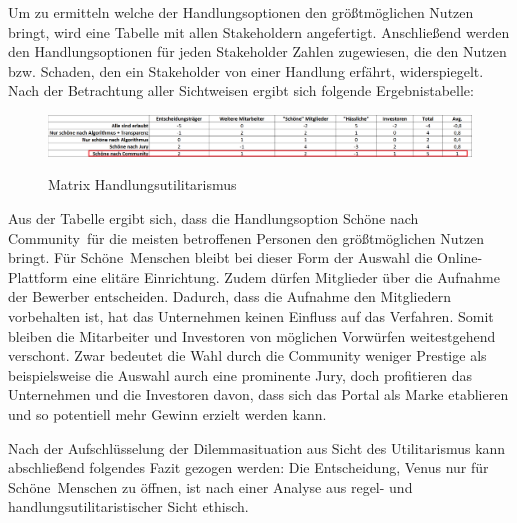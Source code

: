 Um zu ermitteln welche der Handlungsoptionen den größtmöglichen Nutzen bringt, wird eine Tabelle mit allen Stakeholdern angefertigt. Anschließend werden den Handlungsoptionen
für jeden Stakeholder Zahlen zugewiesen, die den Nutzen bzw. Schaden, den ein Stakeholder von einer Handlung erfährt, widerspiegelt. Nach der Betrachtung aller Sichtweisen ergibt sich folgende Ergebnistabelle:
\begin{figure}[hbt]
	\centering
	\begin{minipage}[t]{1\textwidth} %
	\includegraphics[width=1\textwidth]{Handlungsutilitarismus.png}\\ %
	\caption{Matrix Handlungsutilitarismus} %
	\label{abb:util}
	\end{minipage}
\end{figure}

Aus der Tabelle ergibt sich, dass die Handlungsoption \glqq Schöne nach Community\grqq~für die meisten betroffenen Personen den größtmöglichen Nutzen bringt. Für \glqq Schöne\grqq~Menschen bleibt bei dieser Form der Auswahl die Online-Plattform eine elitäre Einrichtung. Zudem dürfen Mitglieder über die Aufnahme der Bewerber entscheiden. Dadurch, dass die Aufnahme den Mitgliedern vorbehalten ist, hat das Unternehmen keinen Einfluss auf das Verfahren. Somit bleiben die Mitarbeiter und Investoren von möglichen Vorwürfen weitestgehend verschont. Zwar bedeutet die Wahl durch die Community weniger Prestige als beispielsweise die Auswahl aurch eine prominente Jury, doch profitieren das Unternehmen und die Investoren davon, dass sich das Portal als Marke etablieren und so potentiell mehr Gewinn erzielt werden kann.

Nach der Aufschlüsselung der Dilemmasituation aus Sicht des Utilitarismus kann abschließend folgendes Fazit gezogen werden: Die Entscheidung, Venus nur für \glqq Schöne\grqq~Menschen zu öffnen, ist nach einer Analyse aus regel- und handlungsutilitaristischer Sicht ethisch. 



